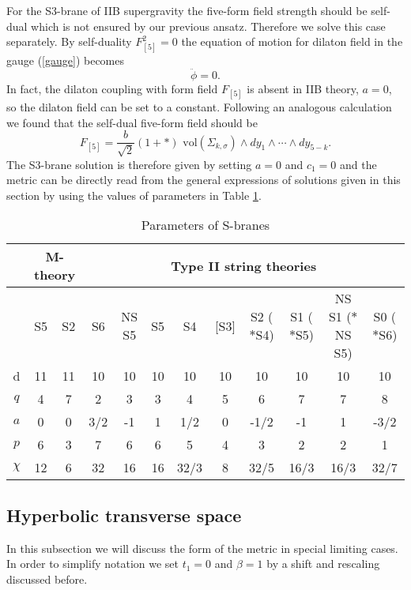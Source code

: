 \documentclass[a4paper,aps,nofootinbib,showpacs,preprint]{revtex4}
\begin{document}
For the S3-brane of IIB supergravity the five-form field strength
should be self-dual which is not ensured by our previous ansatz.
Therefore we solve this case separately. By self-duality
$F_{[5]}^2=0$ the equation of motion for dilaton field in the
gauge (\ref{gauge}) becomes
\begin{equation}
\ddot \phi = 0.
\end{equation}
In fact, the dilaton coupling with form field $F_{[5]}$ is absent
in IIB theory, $a=0$, so the dilaton field can be set to a
constant. Following an analogous calculation we found that the
self-dual five-form field should be
\begin{equation}
F_{[5]} = \frac{b}{\sqrt2} (1 + \ast)  \,\,
\mbox{vol}(\Sigma_{k,\sigma}) \wedge dy_1 \wedge \cdots \wedge
dy_{5-k}.
\end{equation}
The S3-brane solution is therefore given by setting $a=0$ and
$c_1=0$ and the metric can be directly read from the general
expressions of solutions given in this section by using the values
of parameters in Table \ref{table}.

\begin{table}
\caption{\label{table} Parameters of S-branes}
\begin{tabular}{|c||c|c||c|c|c|c|c|c|c|c|c|} \hline
  & \multicolumn{2}{|c|}{M-theory}
  & \multicolumn{9}{|c|}{Type II string theories} \\
  \hline
  & S5 & S2 & S6 & NS S5 & S5 & S4 & [S3] & S2 ($\ast$S4) &
    S1 ($\ast$S5)& NS S1 ($\ast$NS S5) & S0 ($\ast$S6) \\
  \hline\hline
  d & 11 & 11 & 10 & 10 & 10 & 10 & 10 & 10 & 10 & 10 &10 \\
  \hline
  $q$ & 4 & 7 & 2 & 3 & 3 & 4 & 5 & 6 & 7 & 7 & 8 \\
  \hline
  $a$ & 0 & 0 & 3/2 & -1 & 1 & 1/2 & 0 & -1/2 &
  -1 & 1 &-3/2 \\
  \hline\hline
  $p$ & 6 & 3 & 7 & 6 & 6 & 5 & 4 & 3 & 2 & 2 &1 \\
  \hline
  $\chi$ & 12 & 6 & 32 & 16 & 16 & 32/3 & 8 &
  32/5 & 16/3 & 16/3 & 32/7 \\
  \hline
\end{tabular}
\end{table}


\subsection{Hyperbolic transverse space}
In this subsection we will discuss the form of the metric in
special limiting cases. In order to simplify notation we set
$t_1=0$ and $\beta=1$ by a shift and rescaling discussed before.
\end{document}
